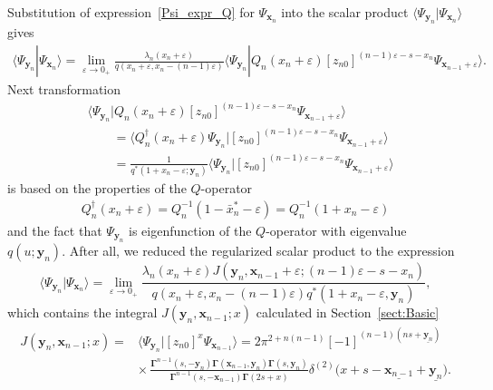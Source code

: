\documentclass[10pt,a4paper]{amsart}
\numberwithin{equation}{section}
\begin{document}
Substitution of expression~\eqref{Psi_expr_Q} for $\Psi_{\bm{x}_n}$ into
the scalar product $\langle \Psi_{\bm{y}_n} | \Psi_{\bm{x}_n} \rangle$ gives
\begin{align*}
	\langle \Psi_{\bm{y}_n} | \Psi_{\bm{x}_n} \rangle =
	\lim\limits_{\varepsilon\to 0_+}
	\frac{\lambda_n(x_n+\varepsilon)}{q(x_n+\varepsilon, x_n-(n-1)\varepsilon)}
	 \bigl\langle \Psi_{\bm{y}_n} |
	Q_n(x_n+\varepsilon) [z_{n0}]^{(n-1)\varepsilon-s-x_n}
	\Psi_{\bm{x}_{n-1}+\varepsilon} \bigr\rangle .
\end{align*}
Next transformation
\begin{align*}
&\bigl\langle \Psi_{\bm{y}_n} |
Q_n(x_n+\varepsilon) [z_{n0}]^{(n-1)\varepsilon-s-x_n}
\Psi_{\bm{x}_{n-1}+\varepsilon}\bigr\rangle \\
& \qquad= \bigl\langle Q_n^\dagger(x_n+\varepsilon) \Psi_{\bm{y}_n} |
[z_{n0}]^{(n-1)\varepsilon-s-x_n}
\Psi_{\bm{x}_{n-1}+\varepsilon}\bigr\rangle \\
& \qquad =
\frac{1}{q^\ast(1+x_n-\varepsilon; \bm{y}_n)} \bigl\langle \Psi_{\bm{y}_n} |
[z_{n0}]^{(n-1)\varepsilon-s-x_n}
\Psi_{\bm{x}_{n-1}+\varepsilon}\bigr\rangle
\end{align*}
is based on the properties of the $Q$-operator
\begin{align*}
Q_n^\dagger(x_n+\varepsilon) = Q_n^{-1}(1-\bar{x}_n^\ast-\varepsilon) =
Q_n^{-1}(1+x_n-\varepsilon)
\end{align*}
and the fact that $\Psi_{\bm{y}_n}$ is eigenfunction of the
$Q$-operator with eigenvalue $q(u; \bm{y}_n)$.
After all, we reduced the regularized scalar product to the expression
\begin{equation} \label{PsiyPsix2}
	\langle \Psi_{\bm{y}_n} | \Psi_{\bm{x}_n} \rangle =
	\lim\limits_{\varepsilon\to 0_+}
	\frac{\lambda_n(x_n+\varepsilon) J(\bm{y}_n, \bm{x}_{n-1}+\varepsilon; (n-1)\varepsilon-s-x_n)}
	{q(x_n+\varepsilon, x_n-(n-1)\varepsilon)
		q^\ast(1+x_n-\varepsilon,\bm{y}_n)},
\end{equation}
which contains the integral $J(\bm{y}_n,\bm{x}_{n-1}; x)$ calculated in Section~\ref{sect:Basic}
\begin{align*}
J(\bm{y}_n,\bm{x}_{n-1};x) ={}&
\langle\Psi_{\bm{y}_n}|[z_{n0}]^{x} \Psi_{\bm{x}_{n-1}}\rangle =
2\pi^{2+n(n-1)}[-1]^{(n-1)(ns+\underline{\bm{y}_n})} \\
& {\times}\,
\frac{\mathbf{\Gamma}^{n-1}(s ,-\bm{y}_n) \mathbf{\Gamma}(\bm{x}_{n-1},\bm{y}_n)
\mathbf{\Gamma}(s ,\bm{y}_n)}
{\mathbf{\Gamma}^{n-1}(s ,-\bm{x}_{n-1}) \mathbf{\Gamma}(2s+x)}
 \delta^{(2)}\bigl(x+s-\underline{\bm{x}_{n-1}}+\underline{\bm{y}_n}\bigr) .
\end{align*}
\end{document}
